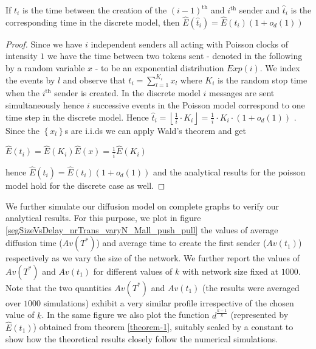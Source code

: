 \begin{theorem}
 If $t_{i}$ is the time between the creation of the $(i-1)^\textrm{th}$ and $i^\textrm{th}$ sender and 
 $\hat{t}_{i}$ is the corresponding time in the discrete model, then $\hat E \left( \hat{t}_{i}\right) =\hat E \left( t_{i}\right)
\left( 1+o_{d}\left( 1\right) \right) $ 
\end{theorem}
\begin{proof}
Since we have $i$ independent senders all acting with Poisson clocks of
intensity $1$ we have the time between two tokens sent - denoted in the
following by a random variable $x$ - to be an exponential distribution $%
Exp\left( i\right).$ We index the events by $l$ and observe that $t_{i}=%
\sum\limits_{l=1}^{K_{i}}x_{l}$ where $K_{i}$ is the
random stop time when the $i^\textrm{th}$ sender is created. In the discrete model $i$
messages are sent simultaneously 
hence $i$ successive events in the Poisson
model correspond to one time step in the discrete model. Hence $\hat{t}%
_{i}=\left\lfloor \frac{1}{i}\cdot K_{i}\right\rfloor =\frac{1}{i}\cdot
K_{i}\cdot \left( 1+o_{d}\left( 1\right) \right) $ . Since the $\left\{
x_{l}\right\} $s are i.i.ds we can apply Wald's theorem \cite{wald} and get 
\begin{center}
$\hat{E}\left( t_{i}\right) =\hat{E}\left( K_{i}\right) \hat{E}%
\left( x\right) =\frac{1}{i}\hat{E}\left( K_{i}\right)$ 
\end{center}%
hence $\hat{E}\left( \hat{t}_{i}\right) =\hat{E}\left( t_{i}\right)
\left( 1+o_{d}\left( 1\right) \right) $ and the analytical results for the poisson model hold for the discrete case as well.
\end{proof}

We further simulate our diffusion model on complete graphs to verify our analytical results. 
For this
purpose, we plot in figure \ref{segSizeVsDelay_nrTrans_varyN_Mall_push_pull}
the values of {average diffusion time ($Av(T^{\ast })$)} and {average time to create the first sender ($Av(t_{1})$)} respectively as we vary the size of the network. We further 
report the values of $Av(T^{\ast })$ and $Av(t_{1})$ for different values of $k$
with network size fixed at $1000$. 
Note that
the two quantities $Av(T^{\ast })$ and $Av(t_{1})$ (the results were averaged over $1000$ simulations) exhibit a
very similar profile irrespective of the chosen value of $k$. 
In the same
figure we also plot the function 
 $d^{\frac{k-1}{k}}$ (represented by $\hat E(t_1)$) { obtained from theorem \ref{theorem-1}}, suitably scaled by a
constant to show how the theoretical results closely follow  the
numerical simulations.

